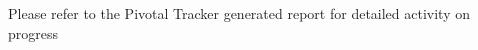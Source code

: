 \documentclass{acm_proc_article-sp}
\begin{document}
Please refer to the Pivotal Tracker generated report for detailed activity on progress




%


%
%
\end{document}
